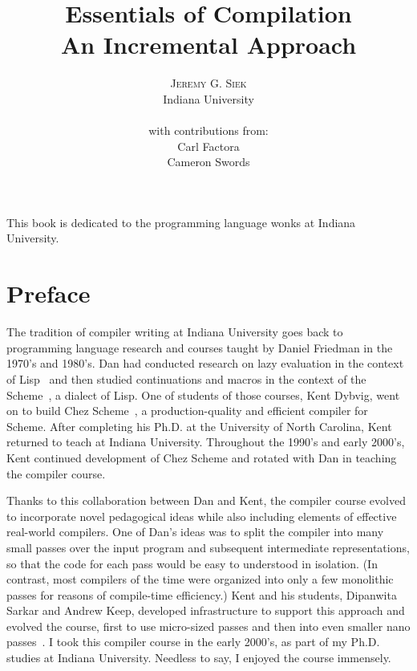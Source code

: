 \documentclass[11pt]{book}
\title{\Huge \textbf{Essentials of Compilation} \\ 
  \huge An Incremental Approach}
\author{\textsc{Jeremy G. Siek} \\
  Indiana University \\
  \\
  with contributions from: \\
  Carl Factora \\
  Cameron Swords
   }
\newenvironment{dedication}
{
   \cleardoublepage
   \thispagestyle{empty}
   \vspace*{\stretch{1}}
   \hfill\begin{minipage}[t]{0.66\textwidth}
   \raggedright
}
{
   \end{minipage}
   \vspace*{\stretch{3}}
   \clearpage
}
\begin{document}
\frontmatter
\maketitle

\begin{dedication}
This book is dedicated to the programming language wonks at Indiana
University.
\end{dedication}

\tableofcontents

\mainmatter

\chapter*{Preface}

The tradition of compiler writing at Indiana University goes back to
programming language research and courses taught by Daniel Friedman in
the 1970's and 1980's. Dan had conducted research on lazy evaluation
in the context of Lisp~\citep{McCarthy:1960dz} and then studied
continuations and macros in the context of the
Scheme~\citep{Sussman:1975ab}, a dialect of Lisp.  One of students of
those courses, Kent Dybvig, went on to build Chez
Scheme~\citep{Dybvig:2006aa}, a production-quality and efficient
compiler for Scheme. After completing his Ph.D. at the University of
North Carolina, Kent returned to teach at Indiana University.
Throughout the 1990's and early 2000's, Kent continued development of
Chez Scheme and rotated with Dan in teaching the compiler course.

Thanks to this collaboration between Dan and Kent, the compiler course
evolved to incorporate novel pedagogical ideas while also including
elements of effective real-world compilers.  One of Dan's ideas was to
split the compiler into many small passes over the input program and
subsequent intermediate representations, so that the code for each
pass would be easy to understood in isolation.  (In contrast, most
compilers of the time were organized into only a few monolithic passes
for reasons of compile-time efficiency.)  Kent and his students,
Dipanwita Sarkar and Andrew Keep, developed infrastructure to support
this approach and evolved the course, first to use micro-sized passes
and then into even smaller nano
passes~\citep{Sarkar:2004fk,Keep:2012aa}. I took this compiler course
in the early 2000's, as part of my Ph.D. studies at Indiana
University. Needless to say, I enjoyed the course immensely.
\end{document}
